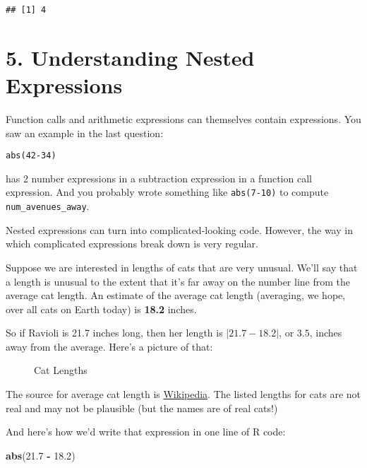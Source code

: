\documentclass[
]{article}
\makeatletter
\newenvironment{Shaded}{\begin{snugshade}}{\end{snugshade}}
\newcommand{\FloatTok}[1]{\textcolor[rgb]{0.00,0.00,0.81}{#1}}
\newcommand{\FunctionTok}[1]{\textcolor[rgb]{0.13,0.29,0.53}{\textbf{#1}}}
\newcommand{\NormalTok}[1]{#1}
\newcommand{\SpecialCharTok}[1]{\textcolor[rgb]{0.81,0.36,0.00}{\textbf{#1}}}
\newcommand*\pandocbounded[1]{%
  \sbox\pandoc@box{#1}%
  \Gscale@div\@tempa{\textheight}{\dimexpr\ht\pandoc@box+\dp\pandoc@box\relax}%
  \Gscale@div\@tempb{\linewidth}{\wd\pandoc@box}%
  \ifdim\@tempb\p@<\@tempa\p@\let\@tempa\@tempb\fi%
  \ifdim\@tempa\p@<\p@\scalebox{\@tempa}{\usebox\pandoc@box}%
  \else\usebox{\pandoc@box}%
  \fi%
}
\makeatother
\begin{document}
\begin{verbatim}
## [1] 4
\end{verbatim}

\section{5. Understanding Nested
Expressions}\label{understanding-nested-expressions}

Function calls and arithmetic expressions can themselves contain
expressions. You saw an example in the last question:

\begin{verbatim}
abs(42-34)
\end{verbatim}

has 2 number expressions in a subtraction expression in a function call
expression. And you probably wrote something like \texttt{abs(7-10)} to
compute \texttt{num\_avenues\_away}.

Nested expressions can turn into complicated-looking code. However, the
way in which complicated expressions break down is very regular.

Suppose we are interested in lengths of cats that are very unusual.
We'll say that a length is unusual to the extent that it's far away on
the number line from the average cat length. An estimate of the average
cat length (averaging, we hope, over all cats on Earth today) is
\textbf{18.2} inches.

So if Ravioli is 21.7 inches long, then her length is \(|21.7 - 18.2|\),
or \(3.5\), inches away from the average. Here's a picture of that:

\begin{figure}
\centering
\pandocbounded{\texttt{[image: cat\_lengths.png]}}
\caption{Cat Lengths}
\end{figure}

The source for average cat length is
\href{https://en.wikipedia.org/wiki/Cat\#:~:text=The\%20domestic\%20cat\%20has\%20a,(9\%20and\%2011\%20lb).}{Wikipedia}.
The listed lengths for cats are not real and may not be plausible (but
the names are of real cats!)

And here's how we'd write that expression in one line of R code:

\begin{Shaded}
\begin{Highlighting}[]
\FunctionTok{abs}\NormalTok{(}\FloatTok{21.7} \SpecialCharTok{{-}} \FloatTok{18.2}\NormalTok{)}
\end{Highlighting}
\end{Shaded}
\end{document}
